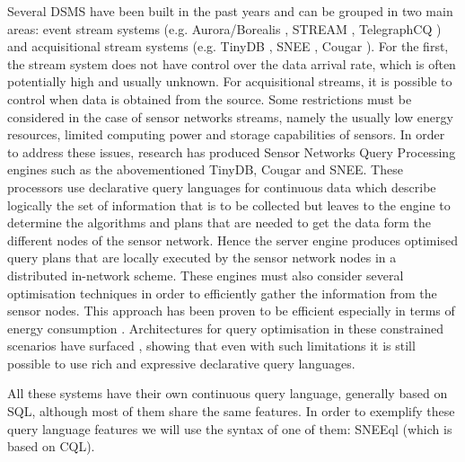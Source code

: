 Several DSMS have been built in the past years and can be grouped in two main areas: event stream systems (e.g. Aurora/Borealis \cite{Abadi_2005}, STREAM \cite{Arasu_06a}, TelegraphCQ \cite{Chandrasekaran_03}) and acquisitional stream systems (e.g. TinyDB \cite{Madden_05}, SNEE \cite{Galpin_09}, Cougar \cite{Yao_02}). For the first, the stream system does not have control over the data arrival rate, which is often potentially high and usually unknown. For acquisitional streams, it is possible to control when data is obtained from the source.
Some restrictions must be considered in the case of sensor networks streams, namely the usually low energy resources, limited computing power and storage capabilities of sensors. In order to address these issues, research has produced Sensor Networks Query Processing engines such as the abovementioned TinyDB, Cougar and SNEE.
These processors use declarative query languages for continuous data which describe logically the set of information that is to be collected but leaves to the engine to determine the algorithms and plans that are needed to get the data form the different nodes of the sensor network. Hence the server engine produces optimised query plans that are locally executed by the sensor network nodes in a distributed in-network scheme. These engines must also consider several optimisation techniques in order to efficiently gather the information from the sensor nodes. This approach has been proven to be efficient especially in terms of energy consumption \cite{Madden_05}. Architectures for query optimisation in these constrained scenarios have surfaced \cite{Galpin_09,Madden_05}, showing that even with such limitations it is still possible to use rich and expressive declarative query languages.

All these systems have their own continuous query language, generally based on SQL, although most of them share the
same features.
In order to exemplify these query language features we will use the syntax of one of them: SNEEql
\cite{Brenninkmeijer_08} (which is based on CQL).
%
%

